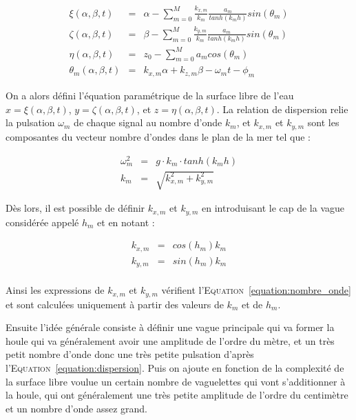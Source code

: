 				\begin{eqnarray}
					\xi(\alpha, \beta, t) & = & \alpha - \sum_{m=0}^{M} \frac{k_{x, m}}{k_m} \frac{a_m}{tanh(k_mh)}sin(\theta_m) \\ 
					\zeta(\alpha, \beta, t) & = & \beta - \sum_{m=0}^{M} \frac{k_{y, m}}{k_m} \frac{a_m}{tanh(k_mh)}sin(\theta_m) \\ 
					\eta(\alpha, \beta, t) & = & z_0 - \sum_{m=0}^{M} a_m cos(\theta_m) \\ 
					\theta_m(\alpha, \beta, t) & = & k_{x, m} \alpha + k_{z, m} \beta - \omega_m t - \phi_m
				\end{eqnarray}

				On a alors défini l'équation paramétrique de la surface libre de l'eau $x = \xi(\alpha, \beta, t)$, $y = \zeta(\alpha, \beta, t)$, et $z = \eta(\alpha, \beta, t)$. La relation de dispersion relie la pulsation $\omega_m$ de chaque signal au nombre d'onde $k_m$, et $k_{x, m}$ et $k_{y, m}$ sont les composantes du vecteur nombre d'ondes dans le plan de la mer tel que  :
				
				\begin{eqnarray}
					\omega_m^2 & = & g \cdot k_m \cdot tanh(k_m h) \label{equation:dispersion} \\
					k_m & = & \sqrt{k_{x, m}^2 + k_{y, m}^2} \label{equation:nombre_onde}
				\end{eqnarray}

				Dès lors, il est possible de définir $k_{x, m}$ et $k_{y, m}$ en introduisant le cap de la vague considérée appelé $h_m$ et en notant :

				\begin{eqnarray}
					k_{x, m} & = & cos(h_m) k_m \\
					k_{y, m} & = & sin(h_m) k_m \\
				\end{eqnarray}

				Ainsi les expressions de $k_{x, m}$ et $k_{y, m}$ vérifient l'\textsc{Equation}~\ref{equation:nombre_onde} et sont calculées uniquement à partir des valeurs de $k_m$ et de $h_m$.
				
				Ensuite l'idée générale consiste à définir une vague principale qui va former la houle qui va généralement avoir une amplitude de l'ordre du mètre, et un très petit nombre d'onde donc une très petite pulsation d'après l'\textsc{Equation}~\ref{equation:dispersion}. Puis on ajoute en fonction de la complexité de la surface libre voulue un certain nombre de vaguelettes qui vont s'additionner à la houle, qui ont généralement une très petite amplitude de l'ordre du centimètre et un nombre d'onde assez grand.

